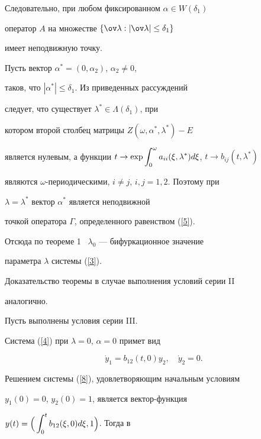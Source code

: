 \begin{pf}
Следовательно, при любом фиксированном $\alpha \in W(\delta_1)$


оператор $A$ на множестве $\{\ov \lambda :|\ov \lambda | \le \delta_1 \}$


имеет неподвижную точку.





Пусть вектор $\alpha ^* =(0,\alpha_2)$, $\alpha_2 \ne 0$,


таков, что $|\alpha ^* | \le \delta_1$. Из приведенных рассуждений


следует, что существует $\lambda ^* \in \Lambda (\delta_1)$, при


котором второй столбец матрицы $Z(\omega,\alpha ^*,\lambda ^*) -E$


является нулевым, а функции $t \to \exp \ds\int_0^\omega


a_{ii} (\xi,\lambda ^*)d\xi$, $t \to b_{ij} (t,\lambda ^*)$


являются $\omega$-периодическими, $i \ne j$, $i,j=1,2$. Поэтому при


$\lambda=\lambda ^*$ вектор $\alpha ^*$ является неподвижной


точкой оператора $\Gamma$, определенного равенством (\ref{5}).


Отсюда по теореме 1 \ $\lambda_0$ --- бифуркационное значение


параметра $\lambda$ системы (\ref{3}).





Доказательство теоремы в случае выполнения условий серии II


аналогично.





Пусть выполнены условия серии III.


Система (\ref{4}) при $\lambda =0$, $\alpha =0$ примет вид


\begin{equation}


\label{8}


\Dot y_1 =b_{12} (t,0)y_2,\quad \Dot y_2 =0.


\end{equation}


Решением системы (\ref{8}), удовлетворяющим начальным условиям 


$y_1 (0)=0$, $y_2 (0)=1$, является вектор-функция


$y(t)=\Big(\displaystyle\int_0^t b_{12} (\xi,0)d\xi,1\Big)$. Тогда в



\end{pf}
